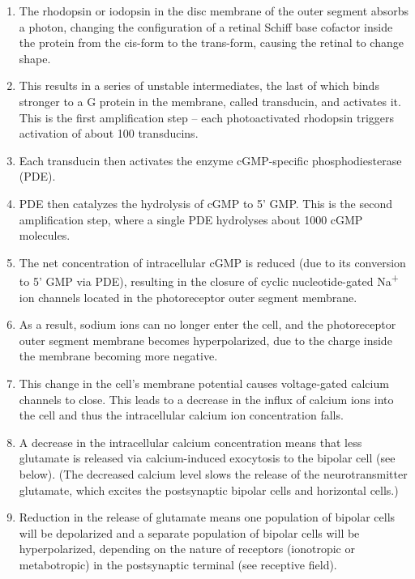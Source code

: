 \begin{enumerate}
\def\labelenumi{\arabic{enumi}.}
\tightlist
\item
  The rhodopsin or iodopsin in the disc membrane of the outer segment absorbs a photon, changing the configuration of a retinal Schiff base cofactor inside the protein from the cis-form to the trans-form, causing the retinal to change shape.
\item
  This results in a series of unstable intermediates, the last of which binds stronger to a G protein in the membrane, called transducin, and activates it. This is the first amplification step -- each photoactivated rhodopsin triggers activation of about 100 transducins.
\item
  Each transducin then activates the enzyme cGMP-specific phosphodiesterase (PDE).
\item
  PDE then catalyzes the hydrolysis of cGMP to 5' GMP. This is the second amplification step, where a single PDE hydrolyses about 1000 cGMP molecules.
\item
  The net concentration of intracellular cGMP is reduced (due to its conversion to 5' GMP via PDE), resulting in the closure of cyclic nucleotide-gated Na\textsuperscript{+} ion channels located in the photoreceptor outer segment membrane.
\item
  As a result, sodium ions can no longer enter the cell, and the photoreceptor outer segment membrane becomes hyperpolarized, due to the charge inside the membrane becoming more negative.
\item
  This change in the cell's membrane potential causes voltage-gated calcium channels to close. This leads to a decrease in the influx of calcium ions into the cell and thus the intracellular calcium ion concentration falls.
\item
  A decrease in the intracellular calcium concentration means that less glutamate is released via calcium-induced exocytosis to the bipolar cell (see below). (The decreased calcium level slows the release of the neurotransmitter glutamate, which excites the postsynaptic bipolar cells and horizontal cells.)
\item
  Reduction in the release of glutamate means one population of bipolar cells will be depolarized and a separate population of bipolar cells will be hyperpolarized, depending on the nature of receptors (ionotropic or metabotropic) in the postsynaptic terminal (see receptive field).
\end{enumerate}

